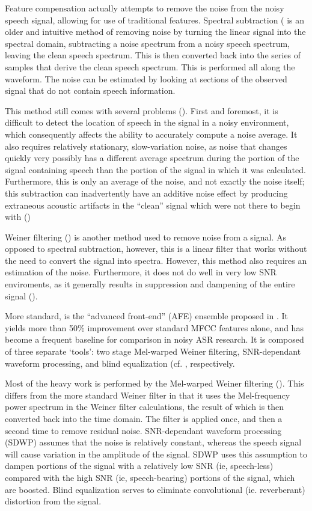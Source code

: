 \documentclass[dissertation,copyright]{uathesis}
\begin{document}
Feature compensation actually attempts to remove the noise from the noisy speech signal, allowing for use of traditional features. Spectral subtraction (\cite{boll:79} is an older and intuitive method of removing noise by turning the linear signal into the spectral domain, subtracting a noise spectrum from a noisy speech spectrum, leaving the clean speech spectrum.  This is then converted back into the series of samples that derive the clean speech spectrum.  This is performed all along the waveform.  The noise can be estimated by looking at sections of the observed signal that do not contain speech information.  

This method still comes with several problems (\cite{li:14}). First and foremost, it is difficult to detect the location of speech in the signal in a noisy environment, which consequently affects the ability to accurately compute a noise average. It also requires relatively stationary, slow-variation noise, as noise that changes quickly very possibly has a different average spectrum during the portion of the signal containing speech than the portion of the signal in which it was calculated.  Furthermore, this is only an average of the noise, and not exactly the noise itself; this subtraction can inadvertently have an additive noise effect by producing extraneous acoustic artifacts in the ``clean'' signal which were not there to begin with (\cite{berouti:79})

Weiner filtering (\cite{weiner:79}) is another method used to remove noise from a signal.  As opposed to spectral subtraction, however, this is a linear filter that works without the need to convert the signal into spectra.  However, this method also requires an estimation of the noise.  Furthermore, it does not do well in very low SNR enviroments, as it generally results in suppression and dampening of the entire signal (\cite{li:14}).

More standard, is the ``advanced front-end'' (AFE) ensemble proposed in \cite{etsi:02}.  It yields more than 50\% improvement over standard MFCC features alone, and has become a frequent baseline for comparison in noisy ASR research.  It is composed of three separate `tools': two stage Mel-warped Weiner filtering, SNR-dependant waveform processing, and blind equalization (cf. \cite{argawal:99,macho:02;macho:01;mauuary:98}, respectively.


Most of the heavy work is performed by the Mel-warped Weiner filtering (\cite{li:14}).  This differs from the more standard Weiner filter in that it uses the Mel-frequency power spectrum in the Weiner filter calculations, the result of which is then converted back into the time domain.  The filter is applied once, and then a second time to remove residual noise.  SNR-dependant waveform processing (SDWP) assumes that the noise is relatively constant, whereas the speech signal will cause variation in the amplitude of the signal.  SDWP uses this assumption to dampen portions of the signal with a relatively low SNR (ie, speech-less) compared with the high SNR (ie, speech-bearing) portions of the signal, which are boosted.  Blind equalization serves to eliminate convolutional (ie. reverberant) distortion from the signal.
\end{document}
